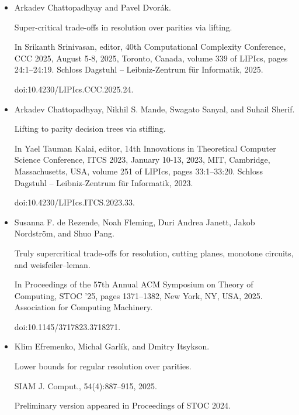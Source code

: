 \begin{itemize}
\item 
[14]

Arkadev Chattopadhyay and Pavel Dvorák.


Super-critical trade-offs in resolution over parities via lifting.


In Srikanth Srinivasan, editor, 40th Computational Complexity
Conference, CCC 2025, August 5-8, 2025, Toronto, Canada, volume 339 of
LIPIcs, pages 24:1–24:19. Schloss Dagstuhl – Leibniz-Zentrum für
Informatik, 2025.


doi:10.4230/LIPIcs.CCC.2025.24.





\item 
[15]

Arkadev Chattopadhyay, Nikhil S. Mande, Swagato Sanyal, and Suhail Sherif.


Lifting to parity decision trees via stifling.


In Yael Tauman Kalai, editor, 14th Innovations in Theoretical
Computer Science Conference, ITCS 2023, January 10-13, 2023, MIT,
Cambridge, Massachusetts, USA, volume 251 of LIPIcs, pages
33:1–33:20. Schloss Dagstuhl – Leibniz-Zentrum für Informatik, 2023.


doi:10.4230/LIPIcs.ITCS.2023.33.





\item 
[16]

Susanna F. de Rezende, Noah Fleming, Duri Andrea Janett, Jakob Nordström,
and Shuo Pang.


Truly supercritical trade-offs for resolution, cutting planes,
monotone circuits, and weisfeiler–leman.


In Proceedings of the 57th Annual ACM Symposium on Theory of
Computing, STOC ’25, pages 1371–1382, New York, NY, USA, 2025. Association
for Computing Machinery.


doi:10.1145/3717823.3718271.





\item 
[17]

Klim Efremenko, Michal Garlík, and Dmitry Itsykson.


Lower bounds for regular resolution over parities.


SIAM J. Comput., 54(4):887–915, 2025.


Preliminary version appeared in Proceedings of STOC 2024.



\end{itemize}

